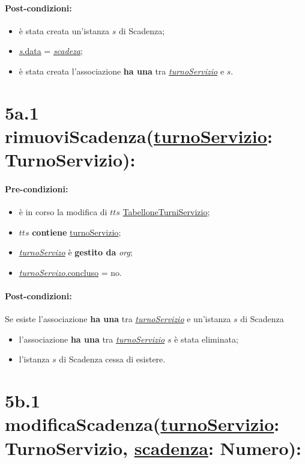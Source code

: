 \paragraph{Post-condizioni:}  
\begin{itemize}
 \item è stata creata un'istanza $s$ di Scadenza;
 \item \underline{\textit{s}.data} = \underline{\textit{scadeza}};
 \item è stata creata l'associazione \textbf{ha una} tra \underline{\textit{turnoServizio}} e $s$.
\end{itemize}

\section*{5a.1 rimuoviScadenza(\underline{turnoServizio}: TurnoServizio):}

\paragraph{Pre-condizioni:}
\begin{itemize}
\item è in corso la modifica di $tts$ \underline{TabelloneTurniServizio};
 \item $tts$ \textbf{contiene} \underline{turnoServizio};
     \item \underline{\textit{turnoServizo}} è \textbf{gestito da} {\textit{org}};
   \item \underline{\textit{turnoServizo}.concluso} = no.
\end{itemize}

\paragraph{Post-condizioni:} Se esiste l'associazione \textbf{ha una} tra \underline{\textit{turnoServizio}} e un'istanza $s$ di Scadenza

\begin{itemize}
\item l'associazione \textbf{ha una} tra \underline{\textit{turnoServizio}} $s$ è stata eliminata;
 \item l'istanza $s$ di Scadenza cessa di esistere.
\end{itemize}

\section*{5b.1 modificaScadenza(\underline{turnoServizio}: TurnoServizio, \underline{scadenza}: Numero):}

